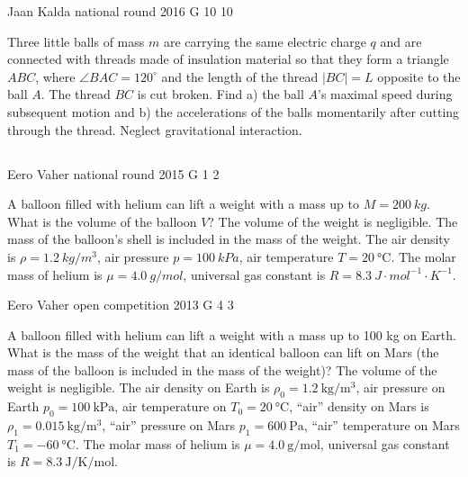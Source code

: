 \documentclass[11pt]{article}
\begin{document}
{Jaan Kalda} %
{national round} %
{2016} %
{G 10} %
{10} %
{

\ifEngStatement
Three little balls of mass $m$ are carrying the same electric charge $q$ and are connected with threads made of insulation material so that they form a triangle $ABC$, where $\angle BAC=120^\circ$ and the length of the thread $|BC|=L$ opposite to the ball $A$. The thread $BC$ is cut broken. Find a) the ball $A$’s maximal speed during subsequent motion and b) the accelerations of the balls momentarily after cutting through the thread. Neglect gravitational interaction.
\fi
}
\newpage\subsection{\protect{}}

{Eero Vaher} %
{national round} %
{2015} %
{G 1} %
{2} %
{

\ifEngStatement
A balloon filled with helium can lift a weight with a mass up to $M=\SI{200}{kg}$. What is the volume of the balloon $V$? The volume of the weight is negligible. The mass of the balloon’s shell is included in the mass of the weight. The air density is $\rho=\SI{1.2}{kg\per m^3}$, air pressure $p=\SI{100}{kPa}$, air temperature $T=\SI{20}{\celsius}$. The molar mass of helium is $\mu=\SI{4.0}{g\per mol}$, universal gas constant is $R=\SI{8.3}{J\cdot mol^{-1}\cdot K^{-1}}$.
\fi
}

{Eero Vaher} %
{open competition} %
{2013} %
{G 4} %
{3} %
{

\ifEngStatement
A balloon filled with helium can lift a weight with a mass up to 100 kg on Earth. What is the mass of the weight that an identical balloon can lift on Mars (the mass of the balloon is included in the mass of the weight)? The volume of the weight is negligible. The air density on Earth is $\rho_0=\SI{1.2}{\kilogram\per\meter^3}$, air pressure on Earth $p_0=\SI{100}{\kilo\pascal}$, air temperature on $T_0=\SI{20}{\celsius}$, “air” density on Mars is $\rho_1=\SI{0.015}{\kilogram\per\meter^3}$, “air” pressure on Mars $p_1=\SI{600}{\pascal}$, “air” temperature on Mars $T_1=\SI{-60}{\celsius}$. The molar mass of helium is $\mu=\SI{4.0}{\gram\per\mole}$, universal gas constant is $R=\SI{8.3}{\joule\per\kelvin\per\mole}$.
\fi
}
\end{document}
